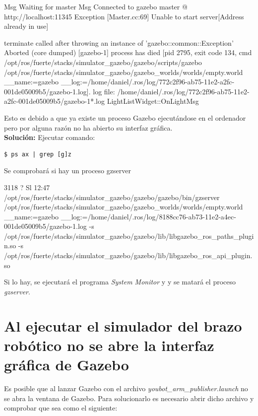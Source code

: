\documentclass[12pt, a4paper]{report}
\begin{document}
\scriptsize\begin{spverbatim}
Msg Waiting for master
Msg Connected to gazebo master @ http://localhost:11345
Exception [Master.cc:69] Unable to start server[Address already in use]


terminate called after throwing an instance of 'gazebo::common::Exception'
Aborted (core dumped)
[gazebo-1] process has died [pid 2795, exit code 134, cmd
/opt/ros/fuerte/stacks/simulator_gazebo/gazebo/scripts/gazebo 
/opt/ros/fuerte/stacks/simulator_gazebo/gazebo_worlds/worlds/empty.world __name:=gazebo 
__log:=/home/daniel/.ros/log/772c2f96-ab75-11e2-a2fc-001de05009b5/gazebo-1.log].
log file: /home/daniel/.ros/log/772c2f96-ab75-11e2-a2fc-001de05009b5/gazebo-1*.log
LightListWidget::OnLightMsg


\end{spverbatim}
\normalsize

Esto es debido a que ya existe un proceso Gazebo ejecutándose en el ordenador pero por alguna razón no ha abierto su interfaz gráfica. \\

\textbf{Solución: }
Ejecutar comando:
\begin{verbatim}
$ ps ax | grep [g]z
\end{verbatim}

Se comprobará si hay un proceso gzserver

\scriptsize
\begin{spverbatim}
 3118 ?        Sl    12:47
 /opt/ros/fuerte/stacks/simulator_gazebo/gazebo/gazebo/bin/gzserver 
 /opt/ros/fuerte/stacks/simulator_gazebo/gazebo_worlds/worlds/empty.world __name:=gazebo 
 __log:=/home/daniel/.ros/log/8188cc76-ab73-11e2-a4ec-001de05009b5/gazebo-1.log -s 
 /opt/ros/fuerte/stacks/simulator_gazebo/gazebo/lib/libgazebo_ros_paths_plugin.so -s
  /opt/ros/fuerte/stacks/simulator_gazebo/gazebo/lib/libgazebo_ros_api_plugin.so

\end{spverbatim}
\normalsize

Si lo hay, se ejecutará el programa \textit{System Monitor} y y se matará el proceso \textit{gzserver}.

\section{Al ejecutar el simulador del brazo robótico no se abre la interfaz gráfica de Gazebo}

Es posible que al lanzar Gazebo con el archivo \textit{youbot\_arm\_publisher.launch} no se abra la ventana de Gazebo. Para solucionarlo es necesario abrir dicho archivo y comprobar que sea como el siguiente:
\end{document}

